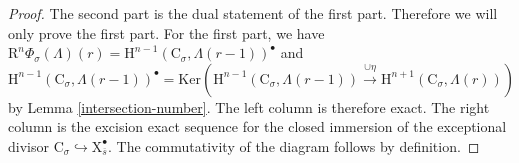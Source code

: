 \documentclass[10pt]{amsart}
\numberwithin{equation}{section}
\theoremstyle{definition}
\def\Ker{\mathrm{Ker}}
\def\rmC{\mathrm{C}}
\def\rmH{\mathrm{H}}
\def\rmR{\mathrm{R}}
\def\rmX{\mathrm{X}}
\begin{document}
\begin{proof}
The second part is the dual statement of the first part. Therefore we will only prove the first part.  For the first part,  we have $\rmR^{n}\Phi_{\sigma}(\Lambda)(r) =\rmH^{n-1}(\rmC_{\sigma}, \Lambda(r-1))^{\bullet}$ and 
\begin{equation*}
\rmH^{n-1}(\rmC_{\sigma}, \Lambda(r-1))^{\bullet}=\Ker(\rmH^{n-1}(\rmC_{\sigma}, \Lambda(r-1))\xrightarrow{\cup \eta} \rmH^{n+1}(\rmC_{\sigma}, \Lambda(r)))
\end{equation*}
by Lemma \ref{intersection-number}.
The left column is therefore exact. The right column is the excision exact sequence for the closed immersion of the exceptional divisor $\rmC_{\sigma}\hookrightarrow {\rmX}^{\bullet}_{\overline{s}}$. The commutativity of the diagram follows by definition.
\end{proof}
\end{document}
